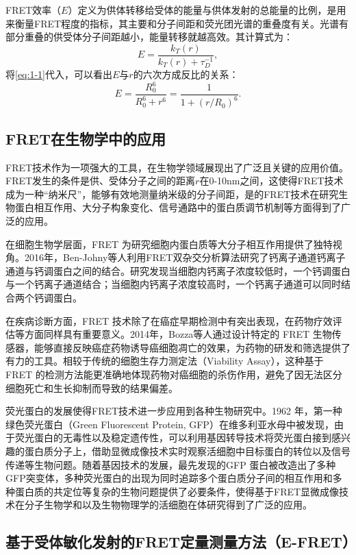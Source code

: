 FRET效率（$E$）定义为供体转移给受体的能量与供体发射的总能量的比例，是用来衡量FRET程度的指标，其主要和分子间距和荧光团光谱的重叠度有关。光谱有部分重叠的供受体分子间距越小，能量转移就越高效。其计算式为：
\begin{equation}
    {E}=\frac{k_T(r)}{k_T(r)+\tau^{-1}_{D}},
\end{equation}
将\ref{eq:1-1}代入，可以看出$E$与$r$的六次方成反比的关系：
\begin{equation}
    E=\frac{R_0^6}{R_0^6+r^6}=\frac{1}{1+(r/R_0)^6}.
\end{equation}
\fi


\subsection{FRET在生物学中的应用}

\ifshowtext
FRET技术作为一项强大的工具，在生物学领域展现出了广泛且关键的应用价值。FRET发生的条件是供、受体分子之间的距离$r$在0-10nm之间，这使得FRET技术成为一种“纳米尺”，能够有效地测量纳米级的分子间距，是的FRET技术在研究生物蛋白相互作用、大分子构象变化、信号通路中的蛋白质调节机制等方面得到了广泛的应用。

在细胞生物学层面，FRET 为研究细胞内蛋白质等大分子相互作用提供了独特视角。2016年，Ben-Johny等人利用FRET双杂交分析算法研究了钙离子通道钙离子通道与钙调蛋白之间的结合。研究发现当细胞内钙离子浓度较低时，一个钙调蛋白与一个钙离子通道结合；当细胞内钙离子浓度较高时，一个钙离子通道可以同时结合两个钙调蛋白。

在疾病诊断方面，FRET 技术除了在癌症早期检测中有突出表现，在药物疗效评估等方面同样具有重要意义。2014年，Bozza等人通过设计特定的 FRET 生物传感器，能够直接反映癌症药物诱导癌细胞凋亡的效果，为药物的研发和筛选提供了有力的工具。相较于传统的细胞生存力测定法（Viability Assay），这种基于 FRET 的检测方法能更准确地体现药物对癌细胞的杀伤作用，避免了因无法区分细胞死亡和生长抑制而导致的结果偏差。

荧光蛋白的发展使得FRET技术进一步应用到各种生物研究中。1962 年，第一种绿色荧光蛋白（Green Fluorescent Protein, GFP）在维多利亚水母中被发现，由于荧光蛋白的无毒性以及稳定遗传性，可以利用基因转导技术将荧光蛋白接到感兴趣的蛋白质分子上，借助显微成像技术实时观察活细胞中目标蛋白的转位以及信号传递等生物问题。随着基因技术的发展，最先发现的GFP 蛋白被改造出了多种GFP突变体，多种荧光蛋白的出现为同时追踪多个蛋白质分子间的相互作用和多种蛋白质的共定位等复杂的生物问题提供了必要条件，使得基于FRET显微成像技术在分子生物学和以及生物物理学的活细胞在体研究得到了广泛的应用。
\fi

\subsection{基于受体敏化发射的FRET定量测量方法（E-FRET）}

